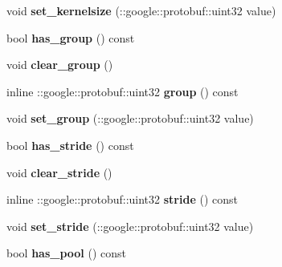 \begin{DoxyCompactItemize}
\mbox{\label{classcaffe_1_1_v0_layer_parameter_a6a58c531a104ce76eb4df721dcf96f38}} 
void {\bfseries set\+\_\+kernelsize} (\+::google\+::protobuf\+::uint32 value)
\item 
\mbox{\label{classcaffe_1_1_v0_layer_parameter_ac11e4249cb00f5e912d9ad93afa9e13a}} 
bool {\bfseries has\+\_\+group} () const
\item 
\mbox{\label{classcaffe_1_1_v0_layer_parameter_af5c1bd1b8091003d1c8c41d645831b52}} 
void {\bfseries clear\+\_\+group} ()
\item 
\mbox{\label{classcaffe_1_1_v0_layer_parameter_a32e217563deb2d888a62d311680ebd99}} 
inline \+::google\+::protobuf\+::uint32 {\bfseries group} () const
\item 
\mbox{\label{classcaffe_1_1_v0_layer_parameter_a05e35218fdd5b9c29e258d28f85f1db7}} 
void {\bfseries set\+\_\+group} (\+::google\+::protobuf\+::uint32 value)
\item 
\mbox{\label{classcaffe_1_1_v0_layer_parameter_a71a5225f6b623ff39cff74dc1eddbc81}} 
bool {\bfseries has\+\_\+stride} () const
\item 
\mbox{\label{classcaffe_1_1_v0_layer_parameter_a08da3f1300dab3558bb3bf934fa3f6a0}} 
void {\bfseries clear\+\_\+stride} ()
\item 
\mbox{\label{classcaffe_1_1_v0_layer_parameter_a967885bc615018f6414712ea31fec04b}} 
inline \+::google\+::protobuf\+::uint32 {\bfseries stride} () const
\item 
\mbox{\label{classcaffe_1_1_v0_layer_parameter_a07f5ed5459469ebfb27617b26a6136a7}} 
void {\bfseries set\+\_\+stride} (\+::google\+::protobuf\+::uint32 value)
\item 
\mbox{\label{classcaffe_1_1_v0_layer_parameter_a7679ea5a346a9136bc68938d8657012c}} 
bool {\bfseries has\+\_\+pool} () const

\end{DoxyCompactItemize}
